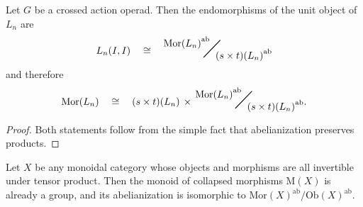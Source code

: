 \documentclass{amsbook} %
\newcommand{\bigquotient}[2]{ \raisebox{0.75\height}{$#1$} \mkern-12mu\scalebox{2}{$\diagup$}\mkern-10mu \raisebox{-0.5\height}{$#2$} }
\numberwithin{section}{chapter}
\begin{document}
\begin{cor}\label{Zmor1} Let $G$ be a crossed action operad. Then the endomorphisms of the unit object of $L_n$ are
\[ L_n(I, I) \quad \cong \quad \bigquotient{{\mathrm{Mor}(L_n)}^{\mathrm{ab}}}{{(s \times t)(L_n)}^{\mathrm{ab}}} \]
and therefore
\[ \mathrm{Mor}(L_n) \quad \cong \quad (s \times t)(L_n) \, \times \, \bigquotient{{\mathrm{Mor}(L_n)}^{\mathrm{ab}}}{{(s \times t)(L_n)}^{\mathrm{ab}}}. \]
\end{cor}
\begin{proof}
Both statements follow from the simple fact that abelianization preserves products.
\end{proof}
\begin{lem} \label{colquot} Let $X$ be any monoidal category whose objects and morphisms are all invertible under tensor product. Then the monoid of collapsed morphisms $\mathrm{M}(X)$ is already a group, and its abelianization is isomorphic to $\mathrm{Mor}(X)^{\mathrm{ab}}/ \mathrm{Ob}(X)^{\mathrm{ab}}$.

\end{lem}
\end{document}
